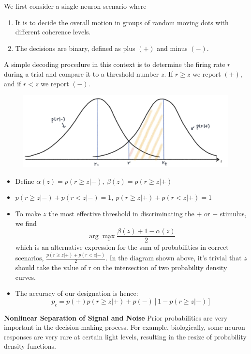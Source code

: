 \documentclass[11pt]{article}
\begin{document}
We first consider a single-neuron scenario where 
\begin{enumerate}
    \item It is to decide the overall motion in groups of random moving dots with different coherence levels. 
    \item The decisions are binary, defined as plus $(+)$ and minus $(-)$.
\end{enumerate}
A simple decoding procedure in this context is to determine the firing rate $r$ during a trial and compare it to a threshold number $z$. If $r\geq z$ we report $(+)$, and if $r<z$ we report $(-)$.
\begin{figure}[H]
    \centering
    \includegraphics[scale=0.2]{imgs/decodebinary.jpg}
\end{figure}
\begin{itemize}
    \item Define $\alpha(z)=p(r\geq z|-), \ \beta(z)=p(r\geq z|+)$
    \item $p(r\geq z|-) + p(r < z|-)=1, \ p(r\geq z|+) + p(r < z|+)=1$
    \item To make $z$ the most effective threshold in discriminating the $+$ or $-$ stimulus, we find \begin{equation*}
        \arg \max_z \frac{\beta(z)+1-\alpha(z)}{2}
    \end{equation*}
    which is an alternative expression for the sum of probabilities in correct scenarios, $\frac{p(r\geq z|+)+p(r<z|-)}{2}$. In the diagram shown above, it's trivial that $z$ should take the value of r on the intersection of two probability density curves.
    \item The accuracy of our designation is hence:
    \begin{equation*}
        p_c=p(+)p(r\geq z|+)+p(-)[1-p(r\geq z|-)]
    \end{equation*}
\end{itemize}
\noindent \textbf{Nonlinear Separation of Signal and Noise}
Prior probabilities are very important in the decision-making process. For example, biologically, some neuron responses are very rare at certain light levels, resulting in the resize of probability density functions.
\\
\end{document}
